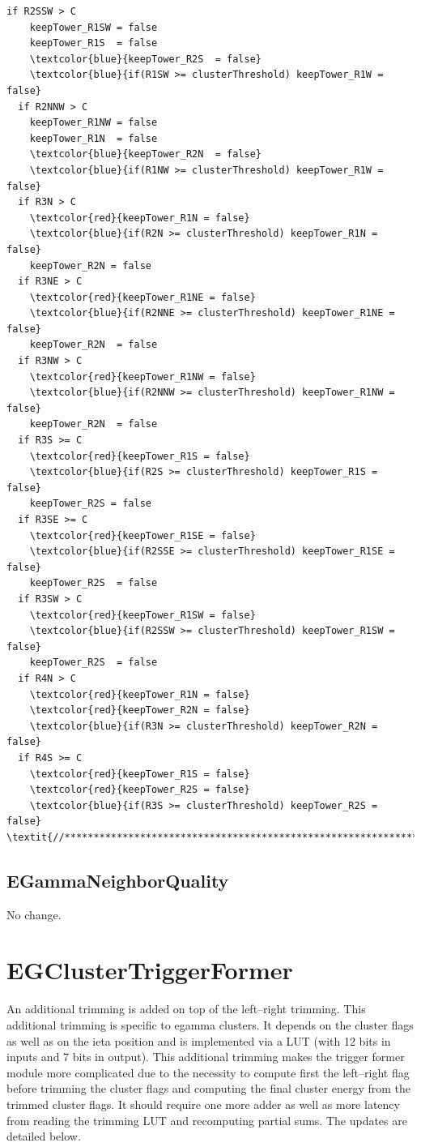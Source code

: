 \documentclass[a4paper, 12pt]{article}
\begin{document}
\begin{Verbatim}[label={Sharing updates}]
  if R2SSW > C
    keepTower_R1SW = false
    keepTower_R1S  = false
    \textcolor{blue}{keepTower_R2S  = false}
    \textcolor{blue}{if(R1SW >= clusterThreshold) keepTower_R1W = false}
  if R2NNW > C
    keepTower_R1NW = false
    keepTower_R1N  = false
    \textcolor{blue}{keepTower_R2N  = false}
    \textcolor{blue}{if(R1NW >= clusterThreshold) keepTower_R1W = false}
  if R3N > C
    \textcolor{red}{keepTower_R1N = false}
    \textcolor{blue}{if(R2N >= clusterThreshold) keepTower_R1N = false}
    keepTower_R2N = false
  if R3NE > C
    \textcolor{red}{keepTower_R1NE = false}
    \textcolor{blue}{if(R2NNE >= clusterThreshold) keepTower_R1NE = false}
    keepTower_R2N  = false
  if R3NW > C
    \textcolor{red}{keepTower_R1NW = false}
    \textcolor{blue}{if(R2NNW >= clusterThreshold) keepTower_R1NW = false}
    keepTower_R2N  = false
  if R3S >= C
    \textcolor{red}{keepTower_R1S = false}
    \textcolor{blue}{if(R2S >= clusterThreshold) keepTower_R1S = false}
    keepTower_R2S = false
  if R3SE >= C
    \textcolor{red}{keepTower_R1SE = false}
    \textcolor{blue}{if(R2SSE >= clusterThreshold) keepTower_R1SE = false}
    keepTower_R2S  = false
  if R3SW > C
    \textcolor{red}{keepTower_R1SW = false}
    \textcolor{blue}{if(R2SSW >= clusterThreshold) keepTower_R1SW = false}
    keepTower_R2S  = false
  if R4N > C
    \textcolor{red}{keepTower_R1N = false}
    \textcolor{red}{keepTower_R2N = false}
    \textcolor{blue}{if(R3N >= clusterThreshold) keepTower_R2N = false}
  if R4S >= C
    \textcolor{red}{keepTower_R1S = false}
    \textcolor{red}{keepTower_R2S = false}
    \textcolor{blue}{if(R3S >= clusterThreshold) keepTower_R2S = false}
\textit{//******************************************************************//}
\end{Verbatim}

\subsection{EGammaNeighborQuality}
No change.

\section{EGClusterTriggerFormer}
An additional trimming is added on top of the left--right trimming. This additional trimming is specific to egamma clusters. It depends on the cluster flags as well as on the ieta position and is implemented via a LUT (with 12 bits in inputs and 7 bits in output).
%
This additional trimming makes the trigger former module more complicated due to the necessity to compute first the left--right flag before trimming the cluster flags and computing the final cluster energy from the trimmed cluster flags. It should require one more adder as well as more latency from reading the trimming LUT and recomputing partial sums. The updates are detailed below.
\end{document}
